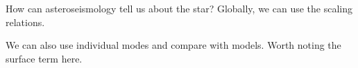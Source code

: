 
How can asteroseismology tell us about the star? Globally, we can use the scaling relations.

We can also use individual modes and compare with models. Worth noting the surface term here.
